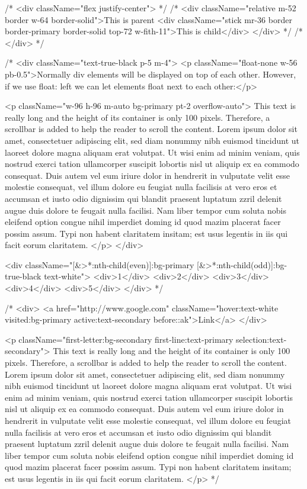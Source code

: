 {      {/* <div className="flex justify-center"> */}
      {/* <div className="relative m-52 border w-64 border-solid">This is parent
      <div className="stick mr-36 border border-primary border-solid top-72 w-fith-11">This is child</div>
      </div> */}
      {/* </div> */}

      {/* <div className="text-true-black p-5 m-4">
        <p className="float-none w-56 pb-0.5">Normally div elements will be displayed on top of each other. However, if we use float: left we can let elements float next to each other:</p>

        <p className="w-96 h-96 m-auto bg-primary pt-2 overflow-auto">
        This text is really long and the height of its container is only 100
        pixels. Therefore, a scrollbar is added to help the reader to scroll the
        content. Lorem ipsum dolor sit amet, consectetuer adipiscing elit, sed
        diam nonummy nibh euismod tincidunt ut laoreet dolore magna aliquam erat
        volutpat. Ut wisi enim ad minim veniam, quis nostrud exerci tation
        ullamcorper suscipit lobortis nisl ut aliquip ex ea commodo consequat.
        Duis autem vel eum iriure dolor in hendrerit in vulputate velit esse
        molestie consequat, vel illum dolore eu feugiat nulla facilisis at vero
        eros et accumsan et iusto odio dignissim qui blandit praesent luptatum
        zzril delenit augue duis dolore te feugait nulla facilisi. Nam liber
        tempor cum soluta nobis eleifend option congue nihil imperdiet doming id
        quod mazim placerat facer possim assum. Typi non habent claritatem
        insitam; est usus legentis in iis qui facit eorum claritatem.
        </p>
      </div>

      
      <div className="[&>*:nth-child(even)]:bg-primary [&>*:nth-child(odd)]:bg-true-black text-white">
  <div>1</div>
  <div>2</div>
  <div>3</div>
  <div>4</div>
  <div>5</div>
</div> */}

  {/* <div>
    <a href="http://www.google.com" className="hover:text-white visited:bg-primary active:text-secondary before::ak">Link</a>
  </div>

  <p className="first-letter:bg-secondary first-line:text-primary selection:text-secondary">
        This text is really long and the height of its container is only 100
        pixels. Therefore, a scrollbar is added to help the reader to scroll the
        content. Lorem ipsum dolor sit amet, consectetuer adipiscing elit, sed
        diam nonummy nibh euismod tincidunt ut laoreet dolore magna aliquam erat
        volutpat. Ut wisi enim ad minim veniam, quis nostrud exerci tation
        ullamcorper suscipit lobortis nisl ut aliquip ex ea commodo consequat.
        Duis autem vel eum iriure dolor in hendrerit in vulputate velit esse
        molestie consequat, vel illum dolore eu feugiat nulla facilisis at vero
        eros et accumsan et iusto odio dignissim qui blandit praesent luptatum
        zzril delenit augue duis dolore te feugait nulla facilisi. Nam liber
        tempor cum soluta nobis eleifend option congue nihil imperdiet doming id
        quod mazim placerat facer possim assum. Typi non habent claritatem
        insitam; est usus legentis in iis qui facit eorum claritatem.
        </p> */}

}
